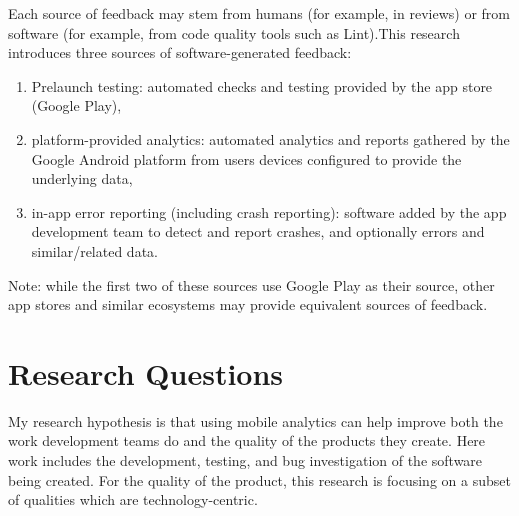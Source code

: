 Each source of feedback may stem from humans (for example, in reviews) or from software (for example, from code quality tools such as Lint).This research introduces three sources of software-generated feedback:
\begin{enumerate}
    \item Prelaunch testing: automated checks and testing provided by the app store (Google Play),
    \item platform-provided analytics: automated analytics and reports gathered by the Google Android platform from users devices configured to provide the underlying data,
    \item in-app error reporting (including crash reporting): software added by the app development team to detect and report crashes, and optionally errors and similar/related data.
\end{enumerate}


Note: while the first two of these sources use Google Play as their source, other app stores and similar ecosystems may provide equivalent sources of feedback.

\section{Research Questions}
\label{section-research-questions}



My research hypothesis is that using mobile analytics can help improve both the work development teams do and the quality of the products they create. Here work includes the development, testing, and bug investigation of the software being created. For the quality of the product, this research is focusing on a subset of qualities which are technology-centric.


